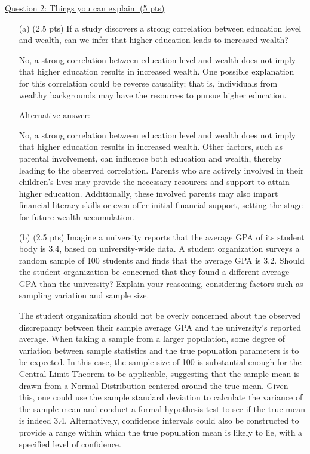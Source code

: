 \documentclass{./../../../Latex/tests}
\begin{document}
\newpage
\underline{Question 2: Things you can explain. (5 pts)}
\begin{enumerate}

\item[(a)] (2.5 pts) If a study discovers a strong correlation between education level and wealth, can we infer that higher education leads to increased wealth? 

No, a strong correlation between education level and wealth does not imply that higher education results in increased wealth. One possible explanation for this correlation could be reverse causality;  that is, individuals from wealthy backgrounds may have the resources to pursue higher education.

Alternative answer: 

No, a strong correlation between education level and wealth does not imply that higher education results in increased wealth. Other factors, such as parental involvement, can influence both education and wealth, thereby leading to the observed correlation. Parents who are actively involved in their children's lives may provide the necessary resources and support to attain higher education. Additionally, these involved parents may also impart financial literacy skills or even offer initial financial support, setting the stage for future wealth accumulation.

\item[(b)] (2.5 pts) Imagine a university reports that the average GPA of its student body is 3.4, based on university-wide data. A student organization surveys a random sample of 100 students and finds that the average GPA is 3.2. Should the student organization be concerned that they found a different average GPA than the university? Explain your reasoning, considering factors such as sampling variation and sample size.


The student organization should not be overly concerned about the observed discrepancy between their sample average GPA and the university's reported average. When taking a sample from a larger population, some degree of variation between sample statistics and the true population parameters is to be expected. In this case, the sample size of 100 is substantial enough for the Central Limit Theorem to be applicable, suggesting that the sample mean is drawn from a Normal Distribution centered around the true mean. Given this, one could use the sample standard deviation to calculate the variance of the sample mean and conduct a formal hypothesis test to see if the true mean is indeed 3.4.  Alternatively, confidence intervals could also be constructed to provide a range within which the true population mean is likely to lie, with a specified level of confidence. 
\end{enumerate}
\end{document}
